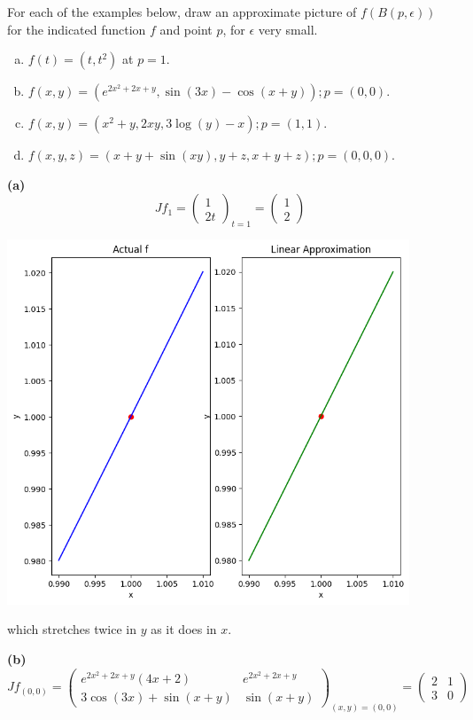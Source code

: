 \documentclass[a4paper, 12pt]{article}
\begin{document}
\begin{problem} 
For each of the examples below, draw an approximate picture of $f(B(p, \epsilon))$   for the indicated function $f$ and point $p$, for $\epsilon$ very small.
\begin{enumerate} [(a)]
    \item $f(t) = (t, t^2)$ at $p = 1$.
    \item $f(x, y) = (e^{2x^2 + 2x + y}, \sin(3x) - \cos(x + y)); p = (0, 0)$.
    \item $f(x, y) = (x^2 + y, 2xy, 3\log(y) - x); p = (1, 1). $
    \item $f(x, y, z) = (x + y + \sin(xy), y + z, x + y + z); p = (0, 0, 0)$.
\end{enumerate}
\end{problem}
\begin{solution}
    \textbf{(a)}
    \[
    Jf_1 = \begin{pmatrix}
    1 \\
    2t
    \end{pmatrix}_{t = 1} = \begin{pmatrix}
    1 \\
    2
    \end{pmatrix}
    \]
    \begin{center}
        \includegraphics[width= 12cm]{./figures/6.8a.png}
    \end{center}
    which stretches twice in $y$ as it does in $x$.

    \textbf{(b)}
    \[
    Jf_{(0, 0)} = \begin{pmatrix}
    e^{2x^2 + 2x + y} (4x + 2) & e^{2x^2 + 2x + y} \\
    3 \cos (3x) + \sin(x +y) & \sin(x+y)
    \end{pmatrix}_{(x, y) = (0, 0)} = \begin{pmatrix}
        2 & 1 \\
        3 & 0
    \end{pmatrix}
    \]
    

\end{solution}
\end{document}
